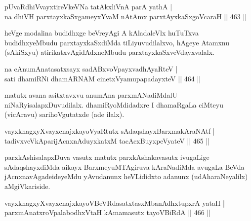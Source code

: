 \begin{shl}
pUvaRdhiVvayxtireVkeVNa tatAkxliVnA parA yathA | \\
na dhiVH parxtayxkaSxgameyxYvaM nA\s \s tAmx parxtAyxkaSxgoVcaraH \hfill||  463 ||  
\end{shl}

\begin{artha}
heVge modalina budidhxge beVreyAgi A kAladaleVlx huTuTxva budidhxyeMbudu parxtayxkaSxdiMda tiLiyuvudilalxvo, hAgeye Atamxnu (sAkiSxyu) atirikatxvAgidAdxneMbudu parxtayxkaSxveVdayxvalalx.
\end{artha}

\begin{shl}
na cAnumAnatasatxsayx sadABxvoV\s payxvadhAyaRteV | \\
sati dhamiRNi dhamARNAM cinetxVyamupapadayxteV \hfill||  464 ||  
\end{shl}

\begin{artha}
matutx avana asitxtavxvu anumAna parxmANadiMdalU niNaRyisalapxDuvudilalx. dhamiRyoMdidadxre I dhamaRgaLa ciMteyu (vicAravu) sarihoVgutatxde (ade ilalx).
\end{artha}

\begin{shl}
vayxknagxyXvayxcnajxkayoVyaRtutx sAdaqshayxBarxmakAraNAtf | \\
tadivxveVkAparijAcnxnAduyxkatxM tacAcxBuyxpeVyateV \hfill||  465 ||  
\end{shl}

\begin{artha}
parxkAshisalapxDuva vasutx matutx parxkAshakavasutx ivugaLige sAdaqshayxdiMda aikayx BarxmeyuMTAgiruva kAraNadiMda avugaLa BeVda jAcnxnavAgadeideyeMdu yAvudanunx heVLididxto adanunx (udAharaNeyalilx) aMgiVkariside.
\end{artha}


\begin{shl}
\footnotemark[1]vayxknagxyXvayxcnajxkayoVBeVRdasatxtasxMbanAdhxtupxrA yataH | \\
parxmAnatxroVpalabodhxV\s taH kAmamasutx tayoVBiRdA \hfill||  466 ||  
\end{shl}

